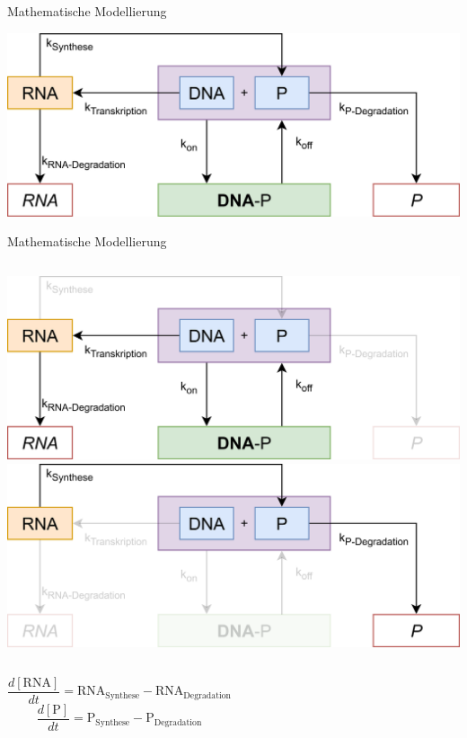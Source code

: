\documentclass[11pt,aspectratio=169,reqno]{beamer}
\begin{document}
\begin{frame}{Mathematische Modellierung}

\includegraphics[width=\textwidth]{images/negative_autoregulation_overview.png}

\end{frame}

\begin{frame}{Mathematische Modellierung}
\begin{columns}
    \includegraphics[width=\textwidth]{images/negative_autoregulation_RNA.png}
    \includegraphics[width=\textwidth]{images/negative_autoregulation_P.png}
\end{columns}
\pause
\vspace{24pt}
\begin{columns}
    \[\frac{d[\text{RNA}]}{dt}=\text{RNA}_{\text{Synthese}}-\text{RNA}_{\text{Degradation}}\]
    \[\frac{d[\text{P}]}{dt}=\text{P}_{\text{Synthese}}-\text{P}_{\text{Degradation}}\]
\end{columns}

\end{frame}
\end{document}
